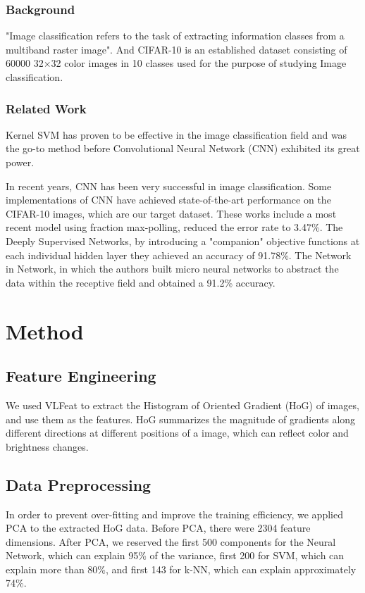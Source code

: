 \documentclass{article} %
\begin{document}
\subsubsection{Background}
"Image classification refers to the task of extracting information classes from a multiband raster image". And CIFAR-10 is an established dataset consisting of 60000 32$\times$32 color images in 10 classes used for the purpose of studying Image classification. 

\subsubsection{Related Work}

Kernel SVM has proven to be effective in the image classification field\cite{chapelle1999support} and was the go-to method before Convolutional Neural Network (CNN) exhibited its great power.

In recent years, CNN has been very successful in image classification. Some implementations of CNN have achieved state-of-the-art performance on the CIFAR-10 images, which are our target dataset. These works include a most recent model using fraction max-polling\cite{graham2014fractional}, reduced the error rate to 3.47\%. The Deeply Supervised Networks\cite{lee2014deeply}, by introducing a "companion" objective functions at each individual hidden layer they achieved an accuracy of 91.78\%. The Network in Network\cite{minlin2014network}, in which the authors built micro neural networks to abstract the data within the receptive field and obtained a 91.2\% accuracy.

\section{Method}

\subsection{Feature Engineering}

We used VLFeat to extract the Histogram of Oriented Gradient (HoG) of images, and use them as the features. HoG summarizes the magnitude of gradients along different directions at different positions of a image, which can reflect color and brightness changes.

\subsection{Data Preprocessing}
In order to prevent over-fitting and improve the training efficiency, we applied PCA to the extracted HoG data. Before PCA, there were 2304 feature dimensions. After PCA, we reserved the first 500 components for the Neural Network, which can explain 95\% of the variance, first 200 for SVM, which can explain more than 80\%, and first 143 for k-NN, which can explain approximately 74\%.
\end{document}

